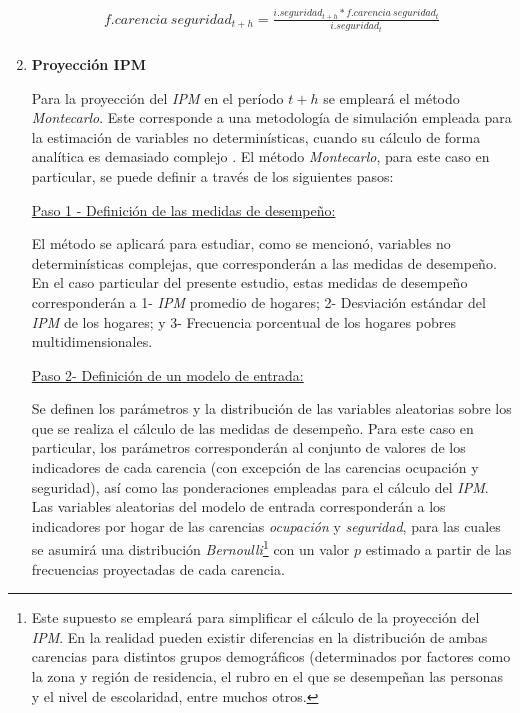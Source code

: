 \documentclass[12pt,letterpaper,spanish]{article}
\begin{document}
\begin{enumerate}
    \begin{equation}\label{calculo_proyeccion_seguridad}
        \begin{split}
            f.carencia\:seguridad_{t+h}=\frac{i.seguridad_{t+h}*f.carencia\:seguridad_t}{i.seguridad_t}\\
        \end{split}
    \end{equation}
    
    
    \item \textbf{Proyección IPM}


Para la proyección del \textit{IPM} en el período $t+h$ se empleará el método \textit{Montecarlo}. Este corresponde a una metodología de simulación empleada para la estimación de variables no determinísticas, cuando su cálculo de forma analítica es demasiado complejo \cite{Law1991SimulationAnalysis}. El método \textit{Montecarlo}, para este caso en particular, se puede definir a través de los siguientes pasos:

\vspace{2em}

\underline{Paso 1 - Definición de las medidas de desempeño:} 

El método se aplicará para estudiar, como se mencionó, variables no determinísticas complejas, que corresponderán a las medidas de desempeño. En el caso particular del presente estudio, estas medidas de desempeño corresponderán a 1- \textit{IPM} promedio de hogares; 2- Desviación estándar del \textit{IPM} de los hogares; y 3- Frecuencia porcentual de los hogares pobres multidimensionales.

\vspace{2em}
        
\underline{Paso 2- Definición de un modelo de entrada:} 

Se definen los parámetros y la distribución de las variables aleatorias sobre los que se realiza el cálculo de las medidas de desempeño. Para este caso en particular, los parámetros corresponderán al conjunto de valores de los indicadores de cada carencia (con excepción de las carencias ocupación y seguridad), así como las ponderaciones empleadas para el cálculo del \textit{IPM}. Las variables aleatorias del modelo de entrada corresponderán a los indicadores por hogar de las carencias \textit{ocupación} y \textit{seguridad}, para las cuales se asumirá una distribución \textit{Bernoulli}\footnote{Este supuesto se empleará para simplificar el cálculo de la proyección del \textit{IPM}. En la realidad pueden existir diferencias en la distribución de ambas carencias para distintos grupos demográficos (determinados por factores como la zona y región de residencia, el rubro en el que se desempeñan las personas y el nivel de escolaridad, entre muchos otros.} con un valor $p$ estimado a partir de las frecuencias proyectadas de cada carencia.\\
        


\end{enumerate}
\end{document}
